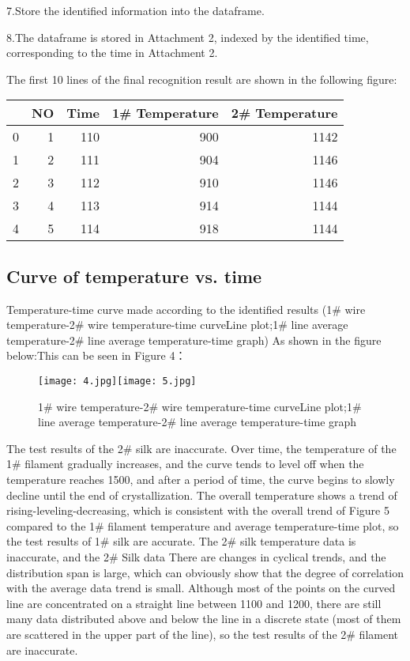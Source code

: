 \documentclass[12pt]{apmcmthesis}
\begin{document}
7.Store the identified information into the dataframe. 

8.The dataframe is stored in Attachment 2, indexed by the identified time, corresponding to the time in Attachment 2.


The first 10 lines of the final recognition result are shown in the following figure:

\begin{center}
\begin{tabular}{lrrrr}
	\toprule
	{} &  NO &  Time &  1\# Temperature &  2\# Temperature \\
	\midrule
	0 &   1 &   110 &             900 &            1142 \\
	1 &   2 &   111 &             904 &            1146 \\
	2 &   3 &   112 &             910 &            1146 \\
	3 &   4 &   113 &             914 &            1144 \\
	4 &   5 &   114 &             918 &            1144 \\
	\bottomrule
\end{tabular}
\end{center}


\subsection{Curve of temperature vs. time}
Temperature-time curve made according to the identified results (1\# wire temperature-2\# wire temperature-time curveLine plot;1\# line average temperature-2\# line average temperature-time graph) As shown in the figure below:This can be seen in Figure 4：
\begin{figure}[htbp]
	\centering
	\texttt{[image: 4.jpg]}\texttt{[image: 5.jpg]}
	\caption{1\# wire temperature-2\# wire temperature-time curveLine plot;1\# line average temperature-2\# line average temperature-time graph}
	\label{a}
\end{figure}
The test results of the 2\# silk are inaccurate. Over time, the temperature of the 1\# filament gradually increases, and the curve tends to level off when the temperature reaches 1500, and after a period of time, the curve begins to slowly decline until the end of crystallization. The overall temperature shows a trend of rising-leveling-decreasing, which is consistent with the overall trend of Figure 5 compared to the 1\# filament temperature and average temperature-time plot, so the test results of 1\# silk are accurate. The 2\# silk temperature data is inaccurate, and the 2\# Silk data There are changes in cyclical trends, and the distribution span is large, which can obviously show that the degree of correlation with the average data trend is small. Although most of the points on the curved line are concentrated on a straight line between 1100 and 1200, there are still many data distributed above and below the line in a discrete state (most of them are scattered in the upper part of the line), so the test results of the 2\# filament are inaccurate.
\end{document}
